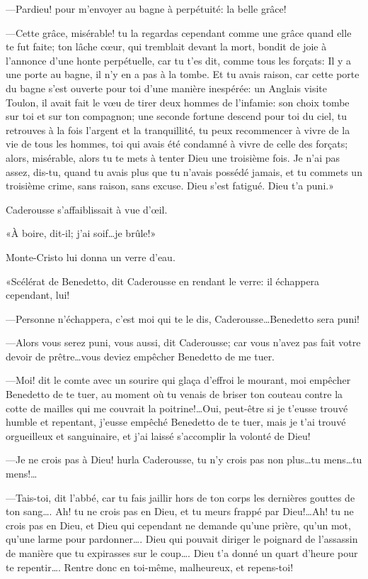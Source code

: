 —Pardieu! pour m'envoyer au bagne à perpétuité: la belle grâce! 

—Cette grâce, misérable! tu la regardas cependant comme une grâce quand elle te fut faite; ton lâche cœur, qui tremblait devant la mort, bondit de joie à l'annonce d'une honte perpétuelle, car tu t'es dit, comme tous les forçats: Il y a une porte au bagne, il n'y en a pas à la tombe. Et tu avais raison, car cette porte du bagne s'est ouverte pour toi d'une manière inespérée: un Anglais visite Toulon, il avait fait le vœu de tirer deux hommes de l'infamie: son choix tombe sur toi et sur ton compagnon; une seconde fortune descend pour toi du ciel, tu retrouves à la fois l'argent et la tranquillité, tu peux recommencer à vivre de la vie de tous les hommes, toi qui avais été condamné à vivre de celle des forçats; alors, misérable, alors tu te mets à tenter Dieu une troisième fois. Je n'ai pas assez, dis-tu, quand tu avais plus que tu n'avais possédé jamais, et tu commets un troisième crime, sans raison, sans excuse. Dieu s'est fatigué. Dieu t'a puni.» 

Caderousse s'affaiblissait à vue d'œil. 

«À boire, dit-il; j'ai soif\dots je brûle!» 

Monte-Cristo lui donna un verre d'eau. 

«Scélérat de Benedetto, dit Caderousse en rendant le verre: il échappera cependant, lui! 

—Personne n'échappera, c'est moi qui te le dis, Caderousse\dots Benedetto sera puni! 

—Alors vous serez puni, vous aussi, dit Caderousse; car vous n'avez pas fait votre devoir de prêtre\dots vous deviez empêcher Benedetto de me tuer. 

—Moi! dit le comte avec un sourire qui glaça d'effroi le mourant, moi empêcher Benedetto de te tuer, au moment où tu venais de briser ton couteau contre la cotte de mailles qui me couvrait la poitrine!\dots Oui, peut-être si je t'eusse trouvé humble et repentant, j'eusse empêché Benedetto de te tuer, mais je t'ai trouvé orgueilleux et sanguinaire, et j'ai laissé s'accomplir la volonté de Dieu! 

—Je ne crois pas à Dieu! hurla Caderousse, tu n'y crois pas non plus\dots tu mens\dots tu mens!\dots 

—Tais-toi, dit l'abbé, car tu fais jaillir hors de ton corps les dernières gouttes de ton sang\dots. Ah! tu ne crois pas en Dieu, et tu meurs frappé par Dieu!\dots Ah! tu ne crois pas en Dieu, et Dieu qui cependant ne demande qu'une prière, qu'un mot, qu'une larme pour pardonner\dots. Dieu qui pouvait diriger le poignard de l'assassin de manière que tu expirasses sur le coup\dots. Dieu t'a donné un quart d'heure pour te repentir\dots. Rentre donc en toi-même, malheureux, et repens-toi! 

